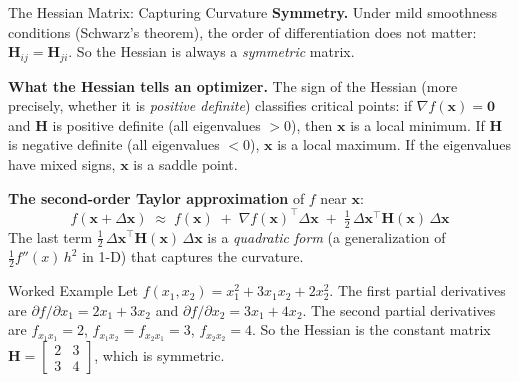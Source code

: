 \documentclass[aspectratio=169,10pt]{beamer}
\newcommand{\x}{\mathbf{x}}
\begin{document}
\begin{frame}[allowframebreaks]{The Hessian Matrix: Capturing Curvature}
  \textbf{Symmetry.}
  Under mild smoothness conditions (Schwarz's theorem), the order of
  differentiation does not matter:
  $\mathbf{H}_{ij} = \mathbf{H}_{ji}$.
  So the Hessian is always a \emph{symmetric} matrix.

  \medskip
  \textbf{What the Hessian tells an optimizer.}
  The sign of the Hessian (more precisely, whether it is
  \emph{positive definite}) classifies critical points:
  if $\nabla f(\x)=\mathbf{0}$ and $\mathbf{H}$ is positive definite
  (all eigenvalues $> 0$), then $\x$ is a local minimum.
  If $\mathbf{H}$ is negative definite (all eigenvalues $< 0$), $\x$ is
  a local maximum.  If the eigenvalues have mixed signs, $\x$ is a saddle
  point.

  \medskip
  \textbf{The second-order Taylor approximation} of $f$ near $\x$:
  \[
    f(\x + \Delta\x)
    \;\approx\;
    f(\x)
    \;+\; \nabla f(\x)^\top \Delta\x
    \;+\; \tfrac{1}{2}\,\Delta\x^\top \mathbf{H}(\x)\,\Delta\x
  \]
  The last term $\tfrac{1}{2}\,\Delta\x^\top \mathbf{H}(\x)\,\Delta\x$
  is a \emph{quadratic form} (a generalization of $\tfrac{1}{2}f''(x)\,h^2$
  in 1-D) that captures the curvature.

  \begin{exampleblock}{Worked Example}
    Let $f(x_1,x_2) = x_1^2 + 3x_1 x_2 + 2x_2^2$.
    The first partial derivatives are $\partial f/\partial x_1 = 2x_1 + 3x_2$
    and $\partial f/\partial x_2 = 3x_1 + 4x_2$.
    The second partial derivatives are
    $f_{x_1 x_1} = 2$, $f_{x_1 x_2} = f_{x_2 x_1} = 3$,
    $f_{x_2 x_2} = 4$.
    So the Hessian is the constant matrix
    $\mathbf{H} = \begin{bmatrix}2 & 3\\ 3 & 4\end{bmatrix}$,
    which is symmetric.
  \end{exampleblock}

\end{frame}
\end{document}
